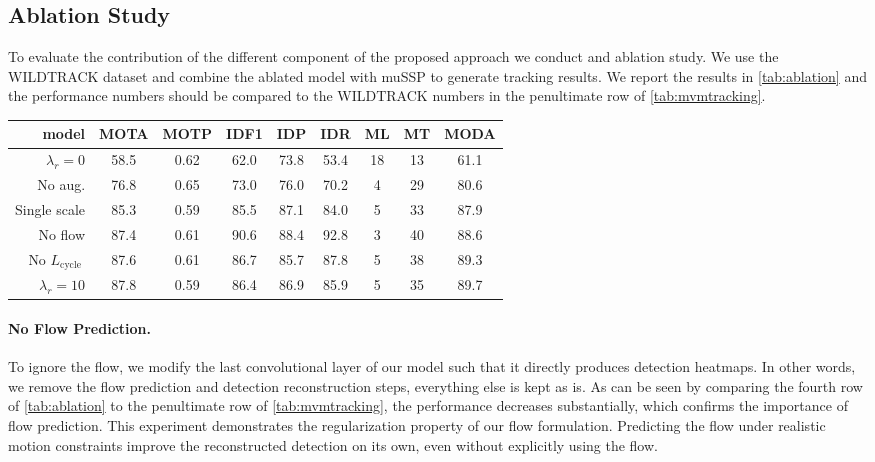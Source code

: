 \documentclass[10pt,twocolumn,letterpaper]{article}
\begin{document}
\subsection{Ablation Study}
To evaluate the contribution of the different component of the proposed approach we conduct and ablation study. We use the WILDTRACK dataset and combine the ablated model with muSSP to generate tracking results.  We report the results in \cref{tab:ablation} and the performance numbers should be compared to the WILDTRACK numbers in the penultimate row of \cref{tab:mvmtracking}.
\begin{table*}[h]
    \begin{center}
    \begin{tabular}{r  c c c c c c c c } \toprule
    
model & MOTA & MOTP & IDF1 & IDP & IDR & ML & MT &  MODA \\ \midrule
    $\lambda_r = 0$ & 58.5 & 0.62 & 62.0 & 73.8 & 53.4 & 18 & 13 & 61.1 \\
    No aug. & 76.8 & 0.65 & 73.0 & 76.0 & 70.2 & 4  & 29 & 80.6 \\
    Single scale & 85.3 & 0.59 & 85.5 & 87.1 & 84.0 & 5  & 33 & 87.9 \\
    No flow & 87.4 & 0.61 & 90.6 & 88.4 & 92.8 & 3 & 40 & 88.6  \\
    No $L_{\text {cycle }}$ & 87.6 & 0.61 & 86.7 & 85.7 & 87.8 & 5 & 38 & 89.3  \\
    $\lambda_r = 10$ & 87.8 & 0.59 & 86.4 & 86.9 & 85.9 & 5 & 35 & 89.7  \\
    \bottomrule
    \end{tabular}
    \end{center}
      \caption{\textbf{Ablation result on multi-view multi-person tracking} Using the WILDTRACK dataset, 
      we test how each component of our model contributes to the overall performance. We remove: the flow balancing term in the loss ($\lambda_r = 0$), the data augmentation, the multi-scale view aggregation and replace it with a single scale one. We replace the flow by directly regressing detection, we remove the temporal consistency term of our loss. All the results are computed using the muSSP association algorithm (comparable to the penultimate row of \cref{tab:mvmtracking})
      }  
     \label{tab:ablation}
     \vspace{-0.5em}
    \end{table*} 
\paragraph*{No Flow Prediction.}
To ignore the flow, we modify the last convolutional layer of our model such that it directly produces detection heatmaps.  In other words, we remove the flow prediction and detection reconstruction steps, everything else is kept as is. As can be seen by comparing the fourth row of \cref{tab:ablation} to the penultimate row of \cref{tab:mvmtracking}, the performance decreases substantially, which confirms the importance of flow prediction. This experiment demonstrates the regularization property of our flow formulation. Predicting the flow under realistic motion constraints improve the reconstructed detection on its own, even without explicitly using the flow.
\end{document}
